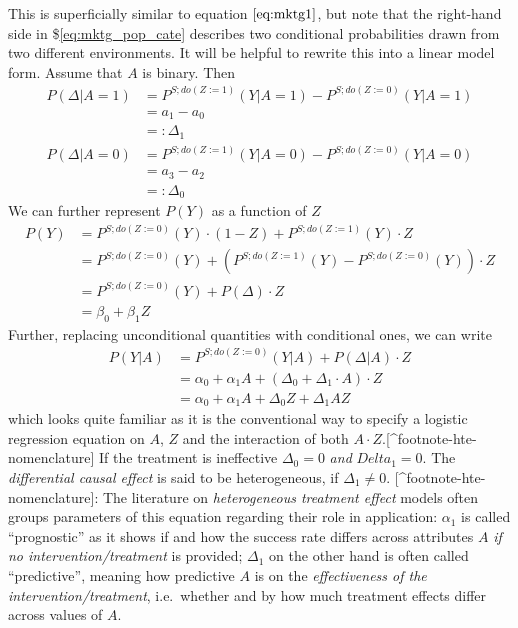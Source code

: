 \documentclass[
]{book}
\theoremstyle{definition}
\theoremstyle{definition}
\theoremstyle{definition}
\theoremstyle{remark}
\begin{document}
This is superficially similar to equation \(\eqref{eq:mktg1}\), but note that the right-hand side in \$\eqref{eq:mktg_pop_cate} describes two conditional probabilities drawn from two different environments.
It will be helpful to rewrite this into a linear model form. Assume that \(A\) is binary. Then
\begin{align}
P(\Delta | A = 1) &= P^{S;do(Z:=1)}(Y | A = 1) - P^{S;do(Z:=0)}(Y | A = 1) \\
                  &= a_1 - a_0 \\
                  &=: \Delta_1 \\
P(\Delta | A = 0) &= P^{S;do(Z:=1)}(Y | A = 0) - P^{S;do(Z:=0)}(Y | A = 0) \\
                  &= a_3 - a_2 \\  
                  &=: \Delta_0           
\end{align}
We can further represent \(P(Y)\) as a function of \(Z\)
\begin{align}
P(Y) &= P^{S;do(Z:=0)}(Y) \cdot (1-Z) + P^{S;do(Z:=1)}(Y) \cdot Z \\
     &= P^{S;do(Z:=0)}(Y) + (P^{S;do(Z:=1)}(Y) - P^{S;do(Z:=0)}(Y)) \cdot Z \\
     &= P^{S;do(Z:=0)}(Y) + P(\Delta) \cdot Z \\
     &= \beta_0 + \beta_1 Z
\end{align}
Further, replacing unconditional quantities with conditional ones, we can write
\begin{align}
P(Y | A) &= P^{S;do(Z:=0)}(Y | A) + P(\Delta | A) \cdot Z \\
         &= \alpha_0 + \alpha_1 A + (\Delta_0 + \Delta_1 \cdot A) \cdot Z \\
         &= \alpha_0 + \alpha_1 A + \Delta_0 Z + \Delta_1 A Z
\end{align}
which looks quite familiar as it is the conventional way to specify a logistic regression equation on \(A\), \(Z\) and the interaction of both \(A \cdot Z\).{[}\^{}footnote-hte-nomenclature{]} If the treatment is ineffective \(\Delta_0 = 0\) \emph{and} \(Delta_1 = 0\). The \emph{differential causal effect} is said to be heterogeneous, if \(\Delta_1 \neq 0\).
{[}\^{}footnote-hte-nomenclature{]}: The literature on \emph{heterogeneous treatment effect} models often groups parameters of this equation regarding their role in application: \(\alpha_1\) is called ``prognostic'' as it shows if and how the success rate differs across attributes \(A\) \emph{if no intervention/treatment} is provided; \(\Delta_1\) on the other hand is often called ``predictive'', meaning how predictive \(A\) is on the \emph{effectiveness of the intervention/treatment}, i.e.~whether and by how much treatment effects differ across values of \(A\).
\end{document}
